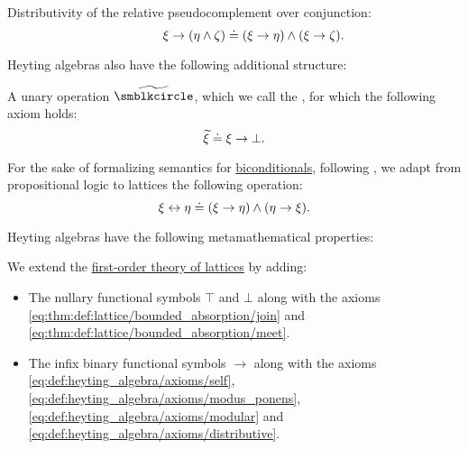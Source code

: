 \begin{definition}
\begin{thmenum}[series=def:heyting_algebra]
\begin{thmenum}
       Distributivity of the relative pseudocomplement over conjunction:
      \begin{equation}\label{eq:def:heyting_algebra/axioms/distributive}
        \mathllap{\xi \rightarrow (\eta \wedge \zeta)} \syneq \mathrlap{(\xi \rightarrow \eta) \wedge (\xi \rightarrow \zeta).}
      \end{equation}
    \end{thmenum}
  \end{thmenum}

  Heyting algebras also have the following additional structure:
  \begin{thmenum}[resume=def:heyting_algebra]
     A unary operation \( {\widetilde {\anon}} \), which we call the , for which the following axiom holds:
    \begin{equation}\label{eq:def:heyting_algebra/pseudocomplement}
      \widetilde \xi \doteq \xi \rightarrow \bot.
    \end{equation}

    \mimprovised For the sake of formalizing semantics for \hyperref[def:propositional_alphabet/connectives/biconditional]{biconditionals}, following , we adapt from propositional logic to lattices the following operation:
    \begin{equation}\label{eq:def:heyting_algebra/biconditional}
      \xi \leftrightarrow \eta \doteq (\xi \rightarrow \eta) \wedge (\eta \rightarrow \xi).
    \end{equation}
  \end{thmenum}

  Heyting algebras have the following metamathematical properties:
  \begin{thmenum}[resume=def:heyting_algebra]
     We extend the \hyperref[def:lattice/theory]{first-order theory of lattices} by adding:
    \begin{itemize}
      \item The nullary functional symbols \( \top \) and \( \bot \) along with the axioms \eqref{eq:thm:def:lattice/bounded_absorption/join} and \eqref{eq:thm:def:lattice/bounded_absorption/meet}.

      \item The infix binary functional symbols \( \rightarrow \) along with the axioms \eqref{eq:def:heyting_algebra/axioms/self}, \eqref{eq:def:heyting_algebra/axioms/modus_ponens}, \eqref{eq:def:heyting_algebra/axioms/modular} and \eqref{eq:def:heyting_algebra/axioms/distributive}.


\end{itemize}
\end{thmenum}
\end{definition}
